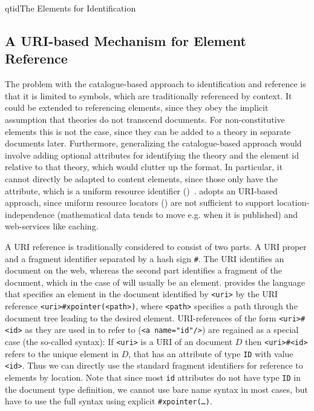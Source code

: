 \begin{myfig}{qtid}{The {\omdoc} Elements for Identification}
 \quicktable{\idtable{}}
\end{myfig}

\subsection{A URI-based Mechanism for Element Reference}\label{sec:ref-URI}

The problem with the catalogue-based approach to identification and reference is
that it is limited to {\openmath} symbols, which are traditionally referenced by
context. It could be extended to referencing {}
elements, since they obey the implicit assumption that theories do not transcend
{\omdoc} documents. For non-constitutive elements this is not the case, since they
can be added to a theory in separate documents later. Furthermore, generalizing
the catalogue-based approach would involve adding optional attributes for
identifying the theory and the element id relative to that theory, which would
clutter up the format. In particular, it cannot directly be adapted to content
{\mathml} {} elements, since those only have the
{} attribute, which is a uniform resource
identifier ({})~\cite{BerFie:uri98}. {\omdoc} adopts an URI-based
approach, since uniform resource locators ({}) are not sufficient to support location-independence
(mathematical data tends to move e.g. when it is published) and web-services like
caching.

A URI reference is traditionally considered to consist of two parts. A URI proper
and a fragment identifier separated by a hash sign {\tt{\#}}. The URI identifies an
{\xml} document on the web, whereas the second part identifies a fragment of the
document, which in the case of {\omdoc} will usually be an {\omdoc} element.
{\xml} provides the {\xpointer} language~\cite{DeRDan:xpointer01} that specifies
an element in the document identified by {\tt{<uri>}} by the URI reference
{\tt{<uri>\#xpointer(<path>)}}, where {\tt{<path>}} specifies a path through the
document tree leading to the desired element. URI-references of the form
{\tt{<uri>\#<id>}} as they are used in {\html} to refer to {} ({\tt{<a name="id"/>}}) are regained as a special case (the
so-called {} syntax): If {\tt{<uri>}} is a URI of an {\xml}
document $D$ then {\tt{<uri>\#<id>}} refers to the unique element in $D$, that has
an attribute of type {\tt{ID}} with value {\tt{<id>}}. Thus we can directly use
the standard {\xpointer} fragment identifiers for reference to {\omdoc} elements
by location. Note that since most {\omdoc} {\tt{id}} attributes do not have type
{\tt{ID}} in the document type definition, we cannot use bare name syntax in most
cases, but have to use the full syntax using explicit {\tt{\#xpointer(\ldots)}}.

